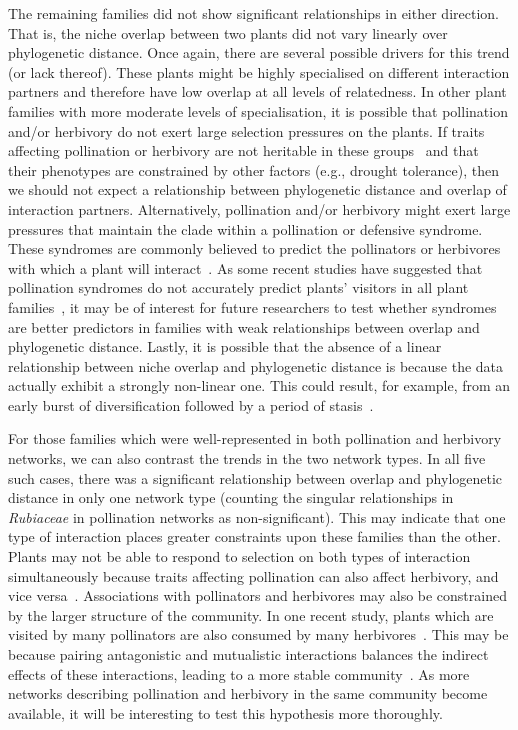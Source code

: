 \documentclass[12pt]{article}
\begin{document}
\begin{spacing}{1.5}
  The remaining families did not show significant relationships 
  in either direction. That is, the niche overlap between two 
  plants did not vary linearly over phylogenetic distance. Once again, there 
  are several possible drivers for this trend (or lack thereof). These plants might 
  be highly specialised on different interaction partners and therefore
  have low overlap at all levels of relatedness. In other plant families
  with more moderate levels of specialisation, it is possible 
  that pollination and/or herbivory do not exert large
  selection pressures on the plants. If traits affecting pollination
  or herbivory are not heritable in these groups~\citep{Kursar2009}
  and that their phenotypes are constrained by other factors (e.g., 
  drought tolerance), then we should not expect a relationship 
  between phylogenetic distance and overlap of interaction partners.
  Alternatively, pollination and/or herbivory might exert large 
  pressures that maintain the clade within a pollination or 
  defensive syndrome. These syndromes are commonly believed to
  predict the pollinators or herbivores with which a plant will 
  interact~\citep{Waser1996,Fenster2004,Ollerton2009,Johnson2014}.
  As some recent studies have suggested that pollination syndromes
  do not accurately predict plants' visitors in all plant 
  families~\citep{Ollerton2009},
  it may be of interest for future researchers to test whether 
  syndromes are better predictors in families with weak 
  relationships between overlap and phylogenetic distance.
  Lastly, it is possible that the absence of a linear relationship 
  between niche overlap and phylogenetic distance is because the data
  actually exhibit a strongly non-linear one. This could result, for 
  example, from an early burst of diversification followed by a period
  of stasis~\citep{Davis2014}.


  For those families which were well-represented in both pollination
  and herbivory networks, we can also contrast the 
  trends in the two network types. In all five such cases, there was
  a significant relationship between overlap and phylogenetic 
  distance in only one network type (counting the singular 
  relationships in \emph{Rubiaceae} in pollination networks as 
  non-significant). This may indicate that one type of interaction
  places greater constraints upon these families than the other. Plants
  may not be able to respond to selection on both types of interaction
  simultaneously because traits affecting pollination can also affect herbivory, and vice
  versa~\citep{Strauss1997,Strauss2002,Adler2004,Adler2006,Theis2006}.
  Associations with pollinators and herbivores may also be constrained by the
  larger structure of the community. In one recent study, plants which are 
  visited by many pollinators are also consumed by many herbivores~\citep{Sauve2015}.
  This may be because pairing antagonistic and mutualistic interactions
  balances the indirect effects of these interactions, leading to a
  more stable community~\citep{Sauve2014}. As more networks describing 
  pollination and herbivory in the same community become available, it 
  will be interesting to test this hypothesis more thoroughly.



\end{spacing}
\end{document}
